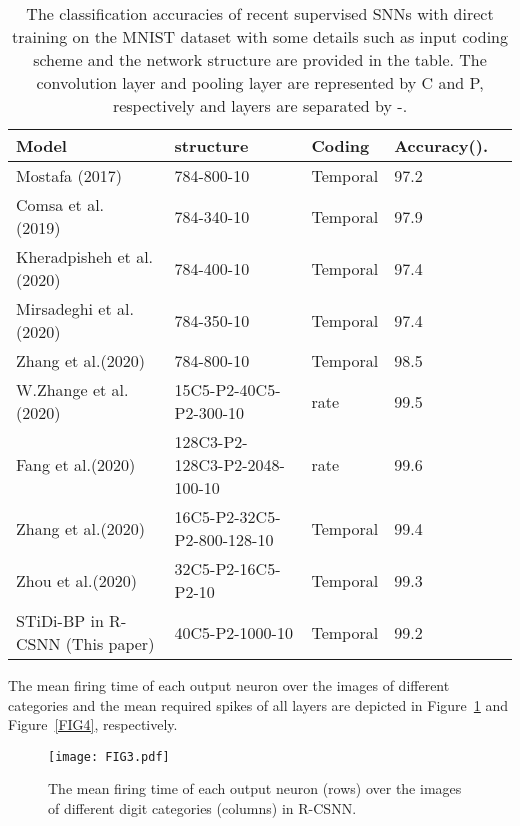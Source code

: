 \documentclass[preprint,twocolumn,5p,12pt]{article}
\begin{document}
\begin{table*}  
\begin{center}
\caption{The classification accuracies of recent supervised SNNs with direct training on the MNIST dataset with some details such as input coding scheme and the network structure are provided in the table. The convolution layer and pooling layer are represented by C and P, respectively and layers are separated by -.} \label{tab2}
\begin{tabular}{llllc}  
\scriptsize
Model & structure & Coding &  Accuracy(). \\
\hline
Mostafa (2017)~\cite{R8}& 784-800-10 & Temporal & 97.2 \\
Comsa et al. (2019)~\cite{R9}& 784-340-10 & Temporal & 97.9 \\
Kheradpisheh et al. (2020)~\cite{R10}& 784-400-10 & Temporal & 97.4 \\
Mirsadeghi et al. (2020)~\cite{R3}& 784-350-10 & Temporal & 97.4 \\
Zhang et al.(2020)~\cite{R18}& 784-800-10 & Temporal & 98.5 \\
W.Zhange et al. (2020)~\cite{R11}& 15C5-P2-40C5-P2-300-10 & rate & 99.5 \\
Fang et al.(2020)~\cite{R13}& 128C3-P2-128C3-P2-2048-100-10  & rate & 99.6 \\
Zhang et al.(2020)~\cite{R18}& 16C5-P2-32C5-P2-800-128-10 & Temporal & 99.4 \\
Zhou et al.(2020)~\cite{S1}& 32C5-P2-16C5-P2-10 & Temporal & 99.3 \\
STiDi-BP in R-CSNN (This paper)& 40C5-P2-1000-10 & Temporal & 99.2 
\end{tabular}
\end{center}
\end{table*}

The mean firing time of each output neuron over the images of different categories and the mean required spikes of all layers are depicted in Figure~\ref{FIG3} and Figure~\ref{FIG4}, respectively.

\begin{figure}[ht]
\centering
\texttt{[image: FIG3.pdf]}  \caption{The mean firing time of each output neuron (rows)
over the images of different digit categories (columns) in R-CSNN.} \label{FIG3}
\end{figure}
\end{document}
